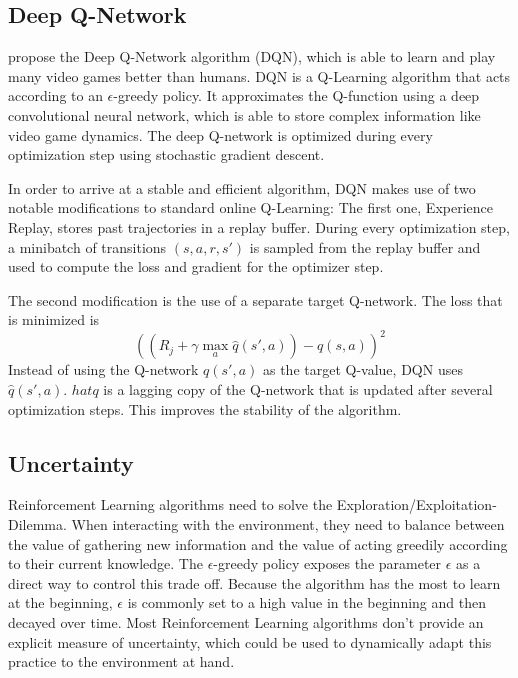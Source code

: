
\subsection{Deep Q-Network}
\cite{mnih2015HumanlevelControlDeep} propose the Deep Q-Network algorithm (DQN), which is able to learn and play many video games better than humans.
DQN is a Q-Learning algorithm that acts according to an $\epsilon$-greedy policy.
It approximates the Q-function using a deep convolutional neural network, which is able to store complex information like video game dynamics.
The deep Q-network is optimized during every optimization step using stochastic gradient descent.

In order to arrive at a stable and efficient algorithm, DQN makes use of two notable modifications to standard online Q-Learning:
The first one, Experience Replay, stores past trajectories in a replay buffer.
During every optimization step, a minibatch of transitions $(s, a, r, s')$ is sampled from the replay buffer and used to compute the loss and gradient for the optimizer step.

The second modification is the use of a separate target Q-network.
The loss that is minimized is
$$ ((R_j + \gamma \max_a{\hat{q}(s',a)}) - q(s,a))^2$$
Instead of using the Q-network $q(s',a)$ as the target Q-value, DQN uses $\hat{q}(s',a)$.
$hat{q}$ is a lagging copy of the Q-network that is updated after several optimization steps.
This improves the stability of the algorithm.



\subsection{Uncertainty}

Reinforcement Learning algorithms need to solve the Exploration/Exploitation-Dilemma.
When interacting with the environment, they need to balance between the value of gathering new information and the value of acting greedily according to their current knowledge.
The $\epsilon$-greedy policy exposes the parameter $\epsilon$ as a direct way to control this trade off.
Because the algorithm has the most to learn at the beginning, $\epsilon$ is commonly set to a high value in the beginning and then decayed over time.
Most Reinforcement Learning algorithms don't provide an explicit measure of uncertainty, which could be used to dynamically adapt this practice to the environment at hand.

